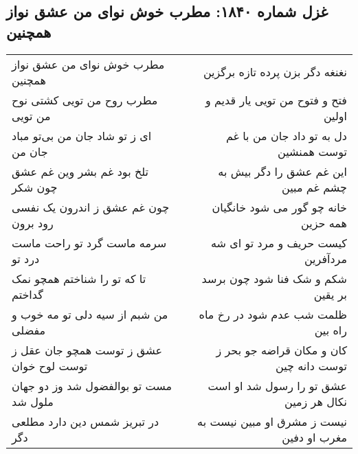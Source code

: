 \begin{center}
\section*{غزل شماره ۱۸۴۰: مطرب خوش نوای من عشق نواز همچنین}
\label{sec:1840}
\begin{longtable}{l p{0.5cm} r}
مطرب خوش نوای من عشق نواز همچنین
&&
نغنغه دگر بزن پرده تازه برگزین
\\
مطرب روح من تویی کشتی نوح من تویی
&&
فتح و فتوح من تویی یار قدیم و اولین
\\
ای ز تو شاد جان من بی‌تو مباد جان من
&&
دل به تو داد جان من با غم توست همنشین
\\
تلخ بود غم بشر وین غم عشق چون شکر
&&
این غم عشق را دگر بیش به چشم غم مبین
\\
چون غم عشق ز اندرون یک نفسی رود برون
&&
خانه چو گور می شود خانگیان همه حزین
\\
سرمه ماست گرد تو راحت ماست درد تو
&&
کیست حریف و مرد تو ای شه مردآفرین
\\
تا که تو را شناختم همچو نمک گداختم
&&
شکم و شک فنا شود چون برسد بر یقین
\\
من شبم از سیه دلی تو مه خوب و مفضلی
&&
ظلمت شب عدم شود در رخ ماه راه بین
\\
عشق ز توست همچو جان عقل ز توست لوح خوان
&&
کان و مکان قراضه جو بحر ز توست دانه چین
\\
مست تو بوالفضول شد وز دو جهان ملول شد
&&
عشق تو را رسول شد او است نکال هر زمین
\\
در تبریز شمس دین دارد مطلعی دگر
&&
نیست ز مشرق او مبین نیست به مغرب او دفین
\\
\end{longtable}
\end{center}
